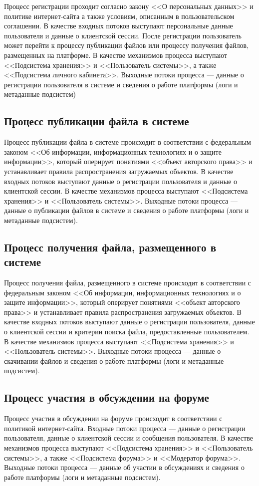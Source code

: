 \documentclass[a4paper,14pt]{extarticle}
\begin{document}
Процесс регистрации проходит согласно закону <<О персональных данных>> и политике интернет-сайта а также условиям, описанным в пользовательском соглашении.  
В качестве входных потоков выступают персональные данные пользователя и данные о клиентской сессии.
После регистрации пользователь может перейти к процессу публикации файлов или процессу получения файлов, размещенных на платформе. В качестве механизмов процесса выступают <<Подсистема хранения>> и <<Пользователь системы>>, а также <<Подсистема личного кабинета>>. Выходные потоки процесса --- данные о регистрации пользователя в системе и сведения о работе платформы (логи и метаданные подсистем)



\subsection{Процесс публикации файла в системе}
Процесс публикации файла в системе происходит в соответствии с федеральным законом <<Об информации, информационных технологиях и о защите информации>>, который оперирует понятиями <<объект авторского права>> и устанавливает правила распространения загружаемых объектов. В качестве входных потоков выступают данные о регистрации пользователя и данные о клиентской сессии. В качестве механизмов процесса выступают <<Подсистема хранения>> и <<Пользователь системы>>. Выходные потоки процесса --- данные о публикации файлов в системе и сведения о работе платформы (логи и метаданные подсистем).


\subsection{Процесс получения файла, размещенного в системе}
Процесс получения файла, размещенного в системе происходит в соответствии с федеральным законом <<Об информации, информационных технологиях и о защите информации>>, который оперирует понятиями <<объект авторского права>> и устанавливает правила распространения загружаемых объектов. В качестве входных потоков выступают данные о регистрации пользователя, данные о клиентской сессии и критерии поиска файла, предоставленные пользователем. В качестве механизмов процесса выступают <<Подсистема хранения>> и <<Пользователь системы>>. Выходные потоки процесса --- данные о скачивании файлов и сведения о работе платформы (логи и метаданные подсистем).


\subsection{Процесс участия в обсуждении на форуме}
Процесс участия в обсуждении на форуме происходит в соответствии с политикой интернет-сайта. Входные потоки процесса --- данные о регистрации пользователя, данные о клиентской сессии и сообщения пользователя.  В качестве механизмов процесса выступают <<Подсистема хранения>> и <<Пользователь системы>>, а также <<Подсистема форума>> и <<Модератор форума>>. Выходные потоки процесса --- данные об участии в обсуждениях и сведения о работе платформы (логи и метаданные подсистем).
\end{document}
